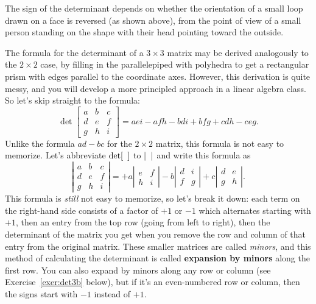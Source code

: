 \documentclass[svgnames]{watsonbook}
\begin{document}
The sign of the determinant depends on whether the orientation of a
small loop drawn on a face is reversed (as shown above), from the
point of view of a small person standing on the shape with their head
pointing toward the outside.

The formula for the determinant of a $3 \times 3$ matrix may be
derived analogously to the $2\times 2$ case, by filling in the
parallelepiped with polyhedra to get a rectangular prism with edges
parallel to the coordinate axes. However, this derivation is quite
messy, and you will develop a more principled approach in a linear
algebra class. So let's skip straight to the formula:
\[
\det \left[\begin{array}{ccc} a & b & c \\ d & e & f \\ g & h & i \end{array}\right] = 
aei - afh - bdi + bfg + cdh - ceg. 
\]
Unlike the formula $ad - bc$ for the $2\times 2$ matrix, this formula is not easy to memorize. Let's abbreviate $\det [ \hphantom{a} ]$ to $| \hphantom{a}|$ and write this formula as 
\[
\left|\begin{array}{ccc} a & b & c \\ d & e & f \\ g & h & i \end{array}\right| = 
+a \left|\begin{array}{cc} e & f \\  h & i \end{array}\right| 
-b \left|\begin{array}{cc} d & i \\  f & g \end{array}\right| 
+c \left|\begin{array}{cc} d & e \\  g & h \end{array}\right|. 
\]
This formula is \textit{still} not easy to memorize, so let's break it down: each term on the right-hand side consists of a factor of $+1$ or $-1$ which alternates starting with $+1$, then an entry from the top row (going from left to right), then the determinant of the matrix you get when you remove the row and column of that entry from the original matrix. These smaller matrices are called \textit{minors}, and this method of calculating the determinant is called \textbf{expansion by minors} along the first row. You can also expand by minors along any row or column (see Exercise~\ref{exer:det3b} below), but if it's an even-numbered row or column, then the signs start with $-1$ instead of $+1$. 
\end{document}
